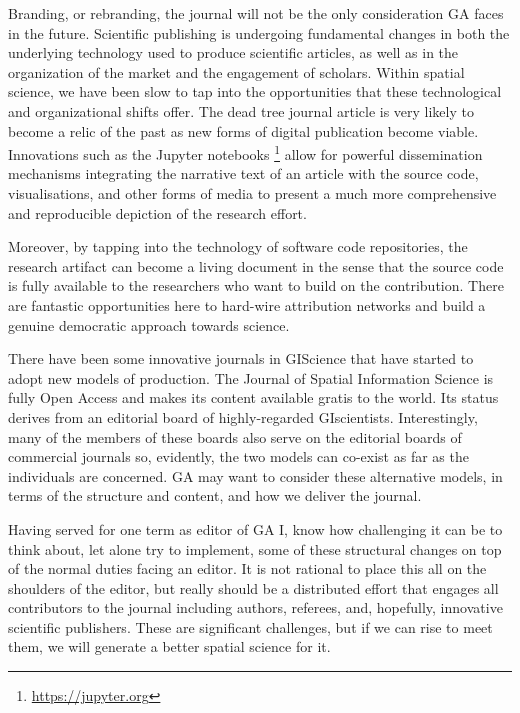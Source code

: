 \documentclass[11pt]{article}
\begin{document}
Branding, or rebranding, the journal will not be the only consideration GA faces
in the future. Scientific publishing is undergoing fundamental changes in both
the underlying technology used to produce scientific articles, as well as in the
organization of the market and the engagement of scholars. Within spatial
science, we have been slow to tap into the opportunities that these technological
and organizational shifts offer. The dead tree journal article is very likely to
become a relic of the past as new forms of digital publication become viable.
Innovations such as the Jupyter notebooks \footnote{\url{https://jupyter.org}}
allow for powerful dissemination mechanisms integrating the narrative text of an
article  with the source code, visualisations, and other forms
of media to present a much more comprehensive and reproducible depiction of the
research effort.

Moreover, by tapping into the technology of software code repositories, the
research artifact can become a living document in the sense that the source code
is fully available to the researchers who want to build on the contribution.
There are fantastic opportunities here to hard-wire attribution networks and
build a genuine democratic approach towards science.

There have been some innovative journals in GIScience that have started to adopt
new models of production. The Journal of Spatial Information Science is fully
Open Access and makes its content available gratis to the world. Its status
derives from an editorial board of highly-regarded GIscientists. Interestingly,
many of the members of these boards also serve on the editorial boards of
commercial journals so, evidently, the two models can co-exist as far as the
individuals are concerned. GA may want to consider these alternative models, in
terms of the structure and content, and how we deliver the journal.

Having served for one term as editor of GA I, know how challenging it can be to
think about, let alone try to implement, some of these structural changes on top
of the normal duties facing an editor. It is not rational to place this all on
the shoulders of the editor, but really should be a distributed effort that
engages all contributors to the journal including authors, referees, and,
hopefully, innovative scientific publishers. These are significant challenges,
but if we can rise to meet them, we will generate a better spatial science for
it.



\end{document}
